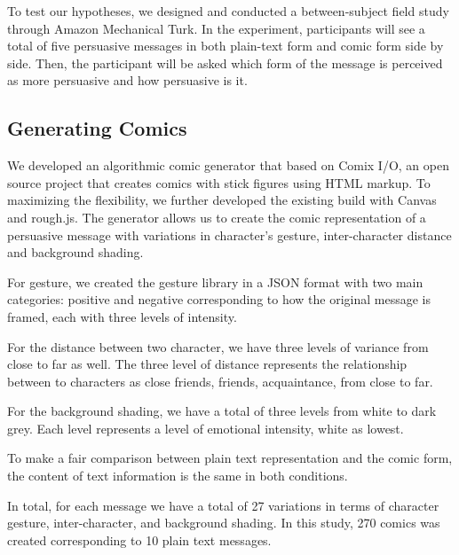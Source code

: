
To test our hypotheses, we designed and conducted a between-subject field study through Amazon Mechanical Turk. In the experiment, participants will see a total of five persuasive messages in both plain-text form and comic form side by side. Then, the participant will be asked which form of the message is perceived as more persuasive and how persuasive is it.
\subsection{Generating Comics}
We developed an algorithmic comic generator that based on Comix I/O, an open source project that creates comics with stick figures using HTML markup. To maximizing the flexibility, we further developed the existing build with Canvas and rough.js. The generator allows us to create the comic representation of a persuasive message with variations in character’s gesture, inter-character distance and background shading.\par
For gesture, we created the gesture library in a JSON format with two main categories: positive and negative corresponding to how the original message is framed, each with three levels of intensity. \par
For the distance between two character, we have three levels of variance from close to far as well. The three level of distance represents the relationship between to characters as close friends, friends, acquaintance, from close to far. \par
For the background shading, we have a total of three levels from white to dark grey. Each level represents a level of emotional intensity, white as lowest. \par
To make a fair comparison between plain text representation and the comic form, the content of text information is the same in both conditions.  \par
In total, for each message we have a total of 27 variations in terms of character gesture, inter-character, and background shading. In this study, 270 comics was created corresponding to 10 plain text messages. \par
